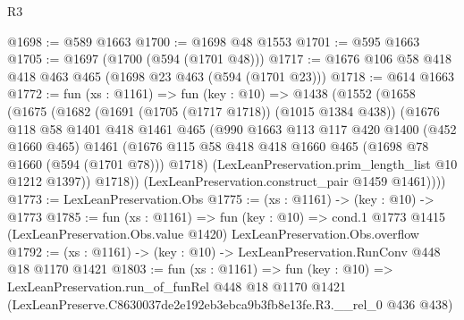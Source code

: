 \begin{lexlean}{R3}
\begin{coremodule}
@1698 := @589 @1663
@1700 := @1698 @48 @1553
@1701 := @595 @1663
@1705 := @1697 (@1700 (@594 (@1701 @48)))
@1717 := @1676 @106 @58 @418 @418 @463 @465 (@1698 @23 @463 (@594 (@1701 @23)))
@1718 := @614 @1663
@1772 := fun (xs : @1161) =>
  fun (key : @10) =>
  @1438
    (@1552
      (@1658
        (@1675
          (@1682
            (@1691 (@1705 (@1717 @1718)) (@1015 @1384 @438))
            (@1676
              @118
              @58
              @1401
              @418
              @1461
              @465
              (@990
                @1663
                @113
                @117
                @420
                @1400
                (@452 @1660 @465)
                @1461
                (@1676 @115 @58 @418 @418 @1660 @465 (@1698 @78 @1660 (@594 (@1701 @78))) @1718)
                (LexLeanPreservation.prim_length_list @10 @1212 @1397))
              @1718))
          (LexLeanPreservation.construct_pair @1459 @1461))))
@1773 := LexLeanPreservation.Obs
@1775 := (xs : @1161) -> (key : @10) -> @1773
@1785 := fun (xs : @1161) =>
  fun (key : @10) =>
  cond.{1} @1773 @1415 (LexLeanPreservation.Obs.value @1420) LexLeanPreservation.Obs.overflow
@1792 := (xs : @1161) -> (key : @10) -> LexLeanPreservation.RunConv @448 @18 @1170 @1421
@1803 := fun (xs : @1161) =>
  fun (key : @10) =>
  LexLeanPreservation.run_of_funRel
    @448
    @18
    @1170
    @1421
    (LexLeanPreserve.C8630037de2e192eb3ebca9b3fb8e13fe.R3.__rel_0 @436 @438)
\end{coremodule}
\end{lexlean}
